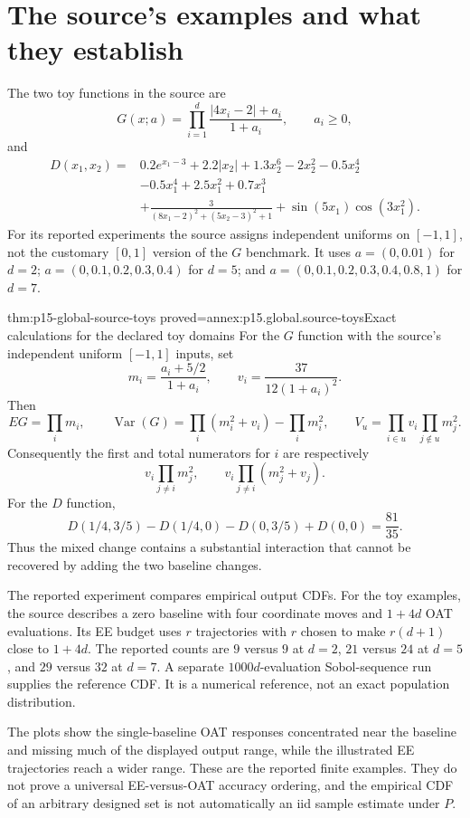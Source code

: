 \section{The source's examples and what they establish}

The two toy functions in the source are
\[
 G(x;a)=\prod_{i=1}^d\frac{|4x_i-2|+a_i}{1+a_i},
 \qquad a_i\geq0,
\]
and
\[
\begin{split}
 D(x_1,x_2)={}&0.2e^{x_1-3}+2.2|x_2|+1.3x_2^6
              -2x_2^2-0.5x_2^4\\
 &-0.5x_1^4+2.5x_1^2+0.7x_1^3\\
 &+\frac3{(8x_1-2)^2+(5x_2-3)^2+1}
       +\sin(5x_1)\cos(3x_1^2).
\end{split}
\]
For its reported experiments the source assigns independent uniforms on
\([-1,1]\), not the customary \([0,1]\) version of the \(G\) benchmark.
It uses \(a=(0,0.01)\) for \(d=2\);
\(a=(0,0.1,0.2,0.3,0.4)\) for \(d=5\); and
\(a=(0,0.1,0.2,0.3,0.4,0.8,1)\) for \(d=7\).

\begin{hbtheorem}{thm:p15-global-source-toys}
 {proved=annex:p15.global.source-toys}{Exact calculations for the declared toy domains}
For the \(G\) function with the source's independent uniform
\([-1,1]\) inputs, set
\[
 m_i=\frac{a_i+5/2}{1+a_i},\qquad
 v_i=\frac{37}{12(1+a_i)^2}.
\]
Then
\[
 EG=\prod_i m_i,\qquad
 \operatorname{Var}(G)=
   \prod_i(m_i^2+v_i)-\prod_i m_i^2,
\qquad
 V_u=\prod_{i\in u}v_i\prod_{j\notin u}m_j^2.
\]
Consequently the first and total numerators for \(i\) are respectively
\[
 v_i\prod_{j\ne i}m_j^2,\qquad
 v_i\prod_{j\ne i}(m_j^2+v_j).
\]
For the \(D\) function,
\[
 D(1/4,3/5)-D(1/4,0)-D(0,3/5)+D(0,0)=\frac{81}{35}.
\]
Thus the mixed change contains a substantial interaction that cannot
be recovered by adding the two baseline changes.
\end{hbtheorem}

The reported experiment compares empirical output CDFs.
For the toy examples, the source describes a zero baseline with four
coordinate moves and \(1+4d\) OAT evaluations.
Its EE budget uses \(r\) trajectories with
\(r\) chosen to make \(r(d+1)\) close to \(1+4d\).
The reported counts are \(9\) versus \(9\) at \(d=2\),
\(21\) versus \(24\) at \(d=5\), and \(29\) versus \(32\) at \(d=7\).
A separate \(1000d\)-evaluation Sobol-sequence run supplies the reference
CDF. It is a numerical reference, not an exact population distribution.

The plots show the single-baseline OAT responses concentrated near the
baseline and missing much of the displayed output range, while the
illustrated EE trajectories reach a wider range. These are the reported
finite examples. They do not prove a universal EE-versus-OAT accuracy
ordering, and the empirical CDF of an arbitrary designed set is not
automatically an iid sample estimate under \(P\).

